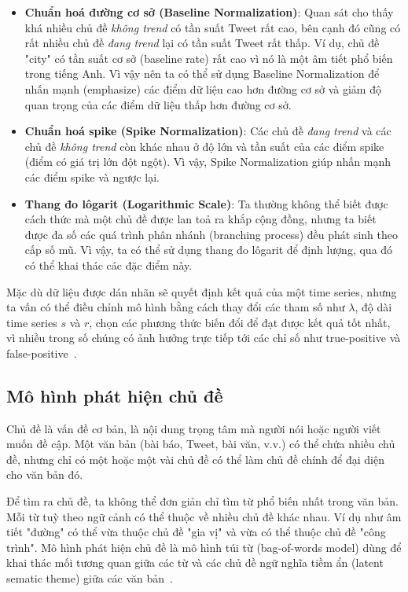 \begin{itemize}
	\item \textbf{Chuẩn hoá đường cơ sở (Baseline Normalization)}: Quan sát cho
		thấy khá nhiều chủ đề \textit{không trend} có tần suất Tweet rất cao,
		bên cạnh đó cũng có rất nhiều chủ đề \textit{đang trend} lại có tần
		suất Tweet rất thấp. Ví dụ, chủ đề "city" có tần suất cơ sở (baseline
		rate) rất cao vì nó là một âm tiết phổ biến trong tiếng Anh. Vì vậy nên
		ta có thể sử dụng Baseline Normalization để nhấn mạnh (emphasize) các
		điểm dữ liệu cao hơn đường cơ sở và giảm độ quan trọng của các điểm dữ
		liệu thấp hơn đường cơ sở.
	
	\item \textbf{Chuẩn hoá spike (Spike Normalization)}: Các chủ đề
		\textit{đang trend} và các chủ đề \textit{không trend} còn khác nhau ở
		độ lớn và tần suất của các điểm spike (điểm có giá trị lớn đột ngột).
		Vì vậy, Spike Normalization giúp nhấn mạnh các điểm spike và ngược lại.
	
	\item \textbf{Thang đo lôgarit (Logarithmic Scale)}: Ta thường không thể
		biết được cách thức mà một chủ đề được lan toả ra khắp cộng đồng, nhưng
		ta biết được đa số các quá trình phân nhánh (branching process) đều
		phát sinh theo cấp số mũ. Vì vậy, ta có thể sử dụng thang đo lôgarit để
		định lượng, qua đó có thể khai thác các đặc điểm này.

\end{itemize}

Mặc dù dữ liệu được dán nhãn sẽ quyết định kết quả của một time series, nhưng
ta vấn có thể điều chỉnh mô hình bằng cách thay đổi các tham số như $\lambda$,
độ dài time series $s$ và $r$, chọn các phương thức biến đổi để đạt được kết
quả tốt nhất, vì nhiều trong số chúng có ảnh hưởng trực tiếp tới các chỉ số như
true-positive và false-positive~\cite{hendricksonTrendDetectionSocial2015}.

\subsection{Mô hình phát hiện chủ đề}
Chủ đề là vấn đề cơ bản, là nội dung trọng tâm mà người nói hoặc người viết
muốn đề cập. Một văn bản (bài báo, Tweet, bài văn, v.v.) có thể chứa nhiều chủ
đề, nhưng chỉ có một hoặc một vài chủ đề có thể làm chủ đề chính để đại diện
cho văn bản đó.

Để tìm ra chủ đề, ta không thể đơn giản chỉ tìm từ phổ biến nhất trong văn bản.
Mỗi từ tuỳ theo ngữ cảnh có thể thuộc về nhiều chủ đề khác nhau. Ví dụ như âm
tiết "đường" có thể vừa thuộc chủ đề "gia vị" và vừa có thể thuộc chủ đề "công
trình". Mô hình phát hiện chủ đề là mô hình túi từ (bag-of-words model) dùng để
khai thác mối tương quan giữa các từ và các chủ đề ngữ nghĩa tiềm ẩn (latent
sematic theme) giữa các văn bản~\cite{madaniRealtimeTrendingTopics2015}.

